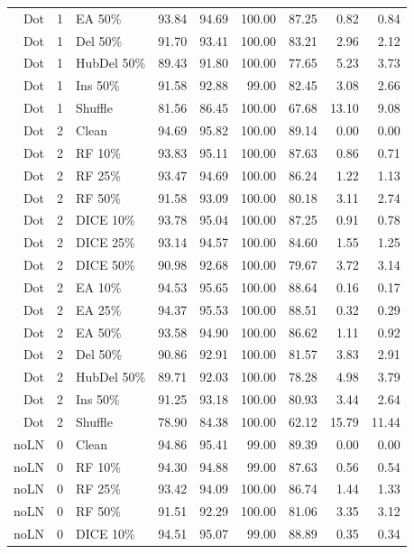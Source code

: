 {\begin{longtable}{rllrrrrrr}
Dot & 1 & EA 50\% & 93.84 & 94.69 & 100.00 & 87.25 & 0.82 & 0.84 \\
Dot & 1 & Del 50\% & 91.70 & 93.41 & 100.00 & 83.21 & 2.96 & 2.12 \\
Dot & 1 & HubDel 50\% & 89.43 & 91.80 & 100.00 & 77.65 & 5.23 & 3.73 \\
Dot & 1 & Ins 50\% & 91.58 & 92.88 & 99.00 & 82.45 & 3.08 & 2.66 \\
Dot & 1 & Shuffle & 81.56 & 86.45 & 100.00 & 67.68 & 13.10 & 9.08 \\
Dot & 2 & Clean & 94.69 & 95.82 & 100.00 & 89.14 & 0.00 & 0.00 \\
Dot & 2 & RF 10\% & 93.83 & 95.11 & 100.00 & 87.63 & 0.86 & 0.71 \\
Dot & 2 & RF 25\% & 93.47 & 94.69 & 100.00 & 86.24 & 1.22 & 1.13 \\
Dot & 2 & RF 50\% & 91.58 & 93.09 & 100.00 & 80.18 & 3.11 & 2.74 \\
Dot & 2 & DICE 10\% & 93.78 & 95.04 & 100.00 & 87.25 & 0.91 & 0.78 \\
Dot & 2 & DICE 25\% & 93.14 & 94.57 & 100.00 & 84.60 & 1.55 & 1.25 \\
Dot & 2 & DICE 50\% & 90.98 & 92.68 & 100.00 & 79.67 & 3.72 & 3.14 \\
Dot & 2 & EA 10\% & 94.53 & 95.65 & 100.00 & 88.64 & 0.16 & 0.17 \\
Dot & 2 & EA 25\% & 94.37 & 95.53 & 100.00 & 88.51 & 0.32 & 0.29 \\
Dot & 2 & EA 50\% & 93.58 & 94.90 & 100.00 & 86.62 & 1.11 & 0.92 \\
Dot & 2 & Del 50\% & 90.86 & 92.91 & 100.00 & 81.57 & 3.83 & 2.91 \\
Dot & 2 & HubDel 50\% & 89.71 & 92.03 & 100.00 & 78.28 & 4.98 & 3.79 \\
Dot & 2 & Ins 50\% & 91.25 & 93.18 & 100.00 & 80.93 & 3.44 & 2.64 \\
Dot & 2 & Shuffle & 78.90 & 84.38 & 100.00 & 62.12 & 15.79 & 11.44 \\
noLN & 0 & Clean & 94.86 & 95.41 & 99.00 & 89.39 & 0.00 & 0.00 \\
noLN & 0 & RF 10\% & 94.30 & 94.88 & 99.00 & 87.63 & 0.56 & 0.54 \\
noLN & 0 & RF 25\% & 93.42 & 94.09 & 100.00 & 86.74 & 1.44 & 1.33 \\
noLN & 0 & RF 50\% & 91.51 & 92.29 & 100.00 & 81.06 & 3.35 & 3.12 \\
noLN & 0 & DICE 10\% & 94.51 & 95.07 & 99.00 & 88.89 & 0.35 & 0.34 \\

\end{longtable}}

